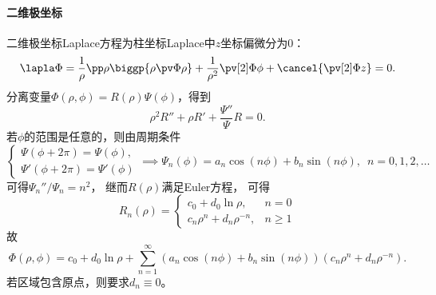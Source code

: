 \paragraph{二维极坐标}
二维极坐标Laplace方程为柱坐标Laplace中$z$坐标偏微分为0：
\begin{equation}
    \lapla\Phi=\frac1\rho\pp\rho\biggp{\rho\pv\Phi\rho}+\frac1{\rho^2}\pv[2]\Phi\phi+\cancel{\pv[2]\Phi z}%
    =0.
\end{equation}
分离变量$\Phi(\rho,\phi)=R(\rho)\Psi(\phi)$，得到
\[
    \rho^2R''+\rho R'+\frac{\Psi''}\Psi R=0.
\]
若$\phi$的范围是任意的，则由周期条件
\[
    \begin{cases}
        \Psi(\phi+2\pi)=\Psi(\phi),\\
        \Psi'(\phi+2\pi)=\Psi'(\phi)
    \end{cases}\implies
    \Psi_n(\phi)=a_n\cos(n\phi)+b_n\sin(n\phi),
    \enspace n=0,1,2,\ldots
\]
可得$\Psi_n''/\Psi_n=n^2$，
继而$R(\rho)$满足Euler方程，
可得
\[
    R_n(\rho)=
    \begin{cases}
        c_0+d_0\ln\rho,&n=0\\
        c_n\rho^n+d_n\rho^{-n},&n\geqslant 1
    \end{cases}
\]
故
\begin{equation}
    \Phi(\rho,\phi)=c_0+d_0\ln\rho+\sum_{n=1}^{\infty}(a_n\cos(n\phi)+b_n\sin(n\phi))(c_n\rho^n+d_n\rho^{-n}).
\end{equation}
若区域包含原点，则要求$d_n\equiv 0$。
